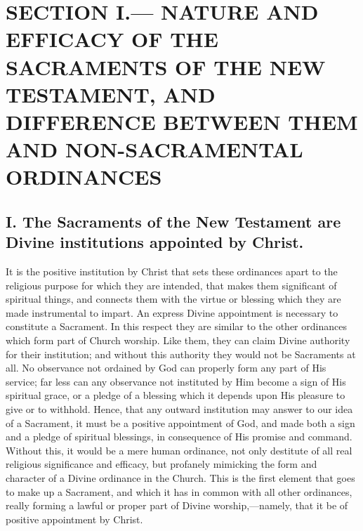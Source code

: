 \documentclass[]{book}
\begin{document}
\hypertarget{section-i.-nature-and-efficacy-of-the-sacraments-of-the-new-testament-and-difference-between-them-and-non-sacramental-ordinances}{%
\section{SECTION I.--- NATURE AND EFFICACY OF THE SACRAMENTS OF THE NEW TESTAMENT, AND DIFFERENCE BETWEEN THEM AND NON-SACRAMENTAL ORDINANCES}\label{section-i.-nature-and-efficacy-of-the-sacraments-of-the-new-testament-and-difference-between-them-and-non-sacramental-ordinances}}

\hypertarget{i.-the-sacraments-of-the-new-testament-are-divine-institutions-appointed-by-christ.}{%
\subsection{I. The Sacraments of the New Testament are Divine institutions appointed by Christ.}\label{i.-the-sacraments-of-the-new-testament-are-divine-institutions-appointed-by-christ.}}

It is the positive institution by Christ that sets these ordinances apart to the religious purpose for which they are intended, that makes them significant of spiritual things, and connects them with the virtue or blessing which they are made instrumental to impart. An express Divine appointment is necessary to constitute a Sacrament. In this respect they are similar to the other ordinances which form part of Church worship. Like them, they can claim Divine authority for their institution; and without this authority they would not be Sacraments at all. No observance not ordained by God can properly form any part of His service; far less can any observance not instituted by Him become a sign of His spiritual grace, or a pledge of a blessing which it depends upon His pleasure to give or to withhold. Hence, that any outward institution may answer to our idea of a Sacrament, it must be a positive appointment of God, and made both a sign and a pledge of spiritual blessings, in consequence of His promise and command. Without this, it would be a mere human ordinance, not only destitute of all real religious significance and efficacy, but profanely mimicking the form and character of a Divine ordinance in the Church. This is the first element that goes to make up a Sacrament, and which it has in common with all other ordinances, really forming a lawful or proper part of Divine worship,---namely, that it be of positive appointment by Christ.
\end{document}
